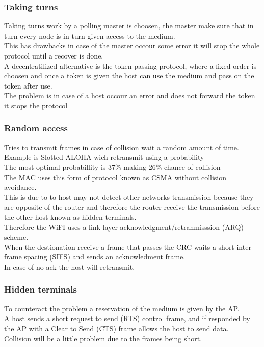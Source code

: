 \documentclass[12pt, a4paper]{article}
\begin{document}
		\subsubsection{Taking turns}
			Taking turns work by a polling master is choosen, the master make sure that in turn every node is in turn given access to the medium.\\
			This has drawbacks in case of the master occour some error it will stop the whole protocol until a recover is done.\\
			A decentratilized alternative is the token passing protocol, where a fixed order is choosen and once a token is given the host can use the medium and pass on the token after use.\\
			The problem is in case of a host occour an error and does not forward the token it stops the protocol
		\subsubsection{Random access}
			Tries to transmit frames in case of collision wait a random amount of time.\\
			Example is Slotted ALOHA wich retransmit using a probability\\
			The most optimal probabillity is 37\% making 26\% chance of collision\\
			The MAC uses this form of protocol known as CSMA without collision avoidance.\\
			This is due to to host may not detect other networks transmission because they are opposite of the router and therefore the router receive the transmission before the other host known as hidden terminals.\\
			Therefore the WiFI uses a link-layer acknowledgment/retranmisssion (ARQ) scheme.\\
			When the destionation receive a frame that passes the CRC waits a short inter-frame spacing (SIFS) and sends an acknowledment frame.\\
			In case of no ack the host will retransmit.\\
		\subsubsection{Hidden terminals}
			To counteract the problem a reservation of the medium is given by the AP.\\
			A host sends a short request to send (RTS) control frame, and if responded by the AP with a Clear to Send (CTS) frame allows the host to send data.\\
			Collision will be a little problem due to the frames being short.\\
\end{document}
